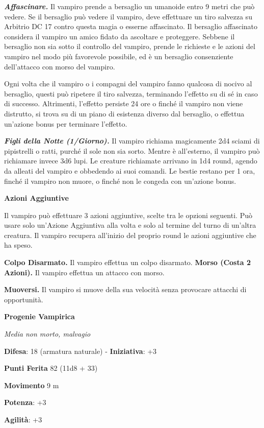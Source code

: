 \begin{multicols}{2}
\emph{\textbf{Affascinare.}} Il vampiro prende a bersaglio un umanoide
entro 9 metri che può vedere. Se il bersaglio può vedere il vampiro,
deve effettuare un tiro salvezza su Arbitrio DC 17 contro questa magia o
esserne affascinato. Il bersaglio affascinato considera il vampiro un
amico fidato da ascoltare e proteggere. Sebbene il bersaglio non sia
sotto il controllo del vampiro, prende le richieste e le azioni del
vampiro nel modo più favorevole possibile, ed è un bersaglio
consenziente dell'attacco con morso del vampiro.

Ogni volta che il vampiro o i compagni del vampiro fanno qualcosa di
nocivo al bersaglio, questi può ripetere il tiro salvezza, terminando
l'effetto su di sé in caso di successo. Altrimenti, l'effetto persiste
24 ore o finché il vampiro non viene distrutto, si trova su di un piano
di esistenza diverso dal bersaglio, o effettua un'azione bonus per
terminare l'effetto.

\emph{\textbf{Figli della Notte (1/Giorno).}} Il vampiro richiama
magicamente 2d4 sciami di pipistrelli o ratti, purché il sole non sia
sorto. Mentre è all'esterno, il vampiro può richiamare invece 3d6 lupi.
Le creature richiamate arrivano in 1d4 round, agendo da alleati del
vampiro e obbedendo ai suoi comandi. Le bestie restano per 1 ora, finché
il vampiro non muore, o finché non le congeda con un'azione bonus.

\textbf{Azioni Aggiuntive}

Il vampiro può effettuare 3 azioni aggiuntive, scelte tra le opzioni
seguenti. Può usare solo un'Azione Aggiuntiva alla volta e solo al
termine del turno di un'altra creatura. Il vampiro recupera all'inizio
del proprio round le azioni aggiuntive che ha speso.

\textbf{Colpo Disarmato.} Il vampiro effettua un colpo disarmato.
\textbf{Morso (Costa 2 Azioni).} Il vampiro effettua un attacco con
morso.

\textbf{Muoversi.} Il vampiro si muove della sua velocità senza
provocare attacchi di opportunità.

\textbf{Progenie Vampirica}

\emph{Media non morto, malvagio}

\textbf{Difesa}: 18 (armatura naturale) - \textbf{Iniziativa}: +3

\textbf{Punti Ferita} 82 (11d8 + 33)

\textbf{Movimento} 9 m

\textbf{Potenza}: +3

\textbf{Agilità}: +3


\end{multicols}
